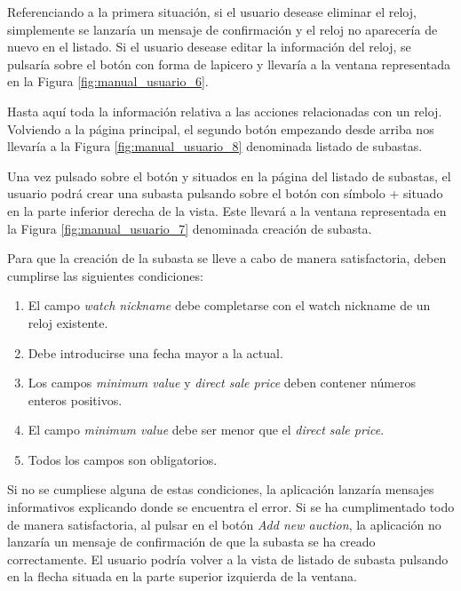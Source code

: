 	Referenciando a la primera situación, si el usuario desease eliminar el reloj, simplemente se lanzaría un mensaje de confirmación y el reloj no aparecería de nuevo en el listado. Si el usuario desease editar la información del reloj, se pulsaría sobre el botón con forma de lapicero y llevaría a la ventana representada en la Figura \ref{fig:manual_usuario_6}.

	
	Hasta aquí toda la información relativa a las acciones relacionadas con un reloj. Volviendo a la página principal, el segundo botón empezando desde arriba nos llevaría a la Figura \ref{fig:manual_usuario_8} denominada listado de subastas.

	
	Una vez pulsado sobre el botón y situados en la página del listado de subastas, el usuario podrá crear una subasta pulsando sobre el botón con símbolo + situado en la parte inferior derecha de la vista. Este llevará a la ventana representada en la Figura \ref{fig:manual_usuario_7} denominada creación de subasta.


	Para que la creación de la subasta se lleve a cabo de manera satisfactoria, deben cumplirse las siguientes condiciones:
	\begin{enumerate}
		\item El campo \emph{watch nickname} debe completarse con el watch nickname de un reloj existente.
		\item Debe introducirse una fecha mayor a la actual.
		\item Los campos \emph{minimum value} y \emph{direct sale price} deben contener números enteros positivos.
		\item El campo \emph{minimum value} debe ser menor que el \emph{direct sale price}.
		\item Todos los campos son obligatorios.
	\end{enumerate}
	
	Si no se cumpliese alguna de estas condiciones, la aplicación lanzaría mensajes informativos explicando donde se encuentra el error. Si se ha cumplimentado todo de manera satisfactoria, al pulsar en el botón \emph{Add new auction}, la aplicación no lanzaría un mensaje de confirmación de que la subasta se ha creado correctamente. El usuario podría volver a la vista de listado de subasta pulsando en la flecha situada en la parte superior izquierda de la ventana.
	
